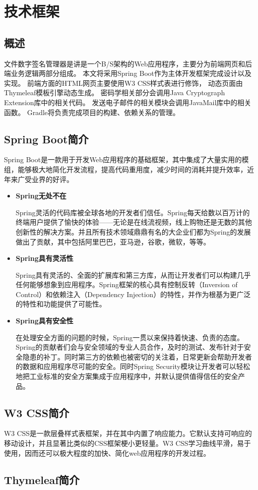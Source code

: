 
\chapter{技术框架}

\section{概述}

文件数字签名管理器是讲是一个B/S架构的Web应用程序，主要分为前端网页和后端业务逻辑两部分组成。
本文将采用Spring Boot\cite{springboot}作为主体开发框架完成设计以及实现。
前端方面的HTML网页主要使用W3 CSS\cite{w3css}样式表进行修饰，
动态页面由Thymeleaf\cite{thymeleaf}模板引擎动态生成。
密码学相关部分会调用Java Cryptograph Extension\cite{jce}库中的相关代码。
发送电子邮件的相关模块会调用JavaMail\cite{javamail}库中的相关函数。
Gradle将负责完成项目的构建、依赖关系的管理。


\section{Spring Boot简介}

Spring Boot是一款用于开发Web应用程序的基础框架，其中集成了大量实用的模组，能够极大地简化开发流程，提高代码重用度，减少时间的消耗并提升效率，近年来广受业界的好评。

\begin{itemize}
	\item \textbf{Spring无处不在}
	
	Spring灵活的代码库被全球各地的开发者们信任。Spring每天给数以百万计的终端用户提供了愉快的体验——无论是在线流视频，线上购物还是无数的其他创新性的解决方案。并且所有技术领域鼎鼎有名的大企业们都为Spring的发展做出了贡献，其中包括阿里巴巴，亚马逊，谷歌，微软，等等。
	
	\item \textbf{Spring具有灵活性}
	
	Spring具有灵活的、全面的扩展库和第三方库，从而让开发者们可以构建几乎任何能够想象到应用程序。Spring框架的核心具有控制反转（Inversion of Control）和依赖注入（Dependency Injection）的特性，并作为根基为更广泛的特性和功能提供了可能性。
	
	\item \textbf{Spring具有安全性}
	
	在处理安全方面的问题的时候，Spring一贯以来保持着快速、负责的态度。Spring的贡献者们会与安全领域的专业人员合作，及时的测试、发布针对于安全隐患的补丁。同时第三方的依赖也被密切的关注着，日常更新会帮助开发者的数据和应用程序尽可能的安全。同时Spring Security模块让开发者可以轻松地把工业标准的安全方案集成于应用程序中，并默认提供值得信任的安全产品。
	
\end{itemize}

\section{W3 CSS简介}

W3 CSS是一款层叠样式表框架，并在其中内置了响应能力。它默认支持可响应的移动设计，并且显著比类似的CSS框架梗小更轻量。W3 CSS学习曲线平滑，易于使用，因而还可以极大程度的加快、简化web应用程序的开发过程。

\section{Thymeleaf简介}
